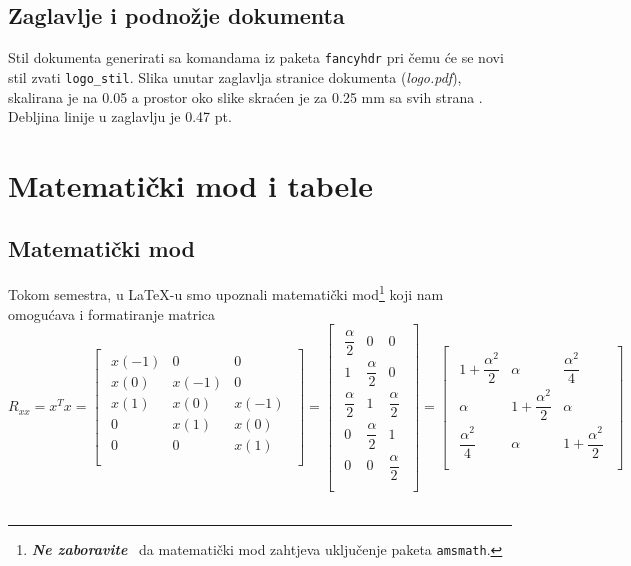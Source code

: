 \documentclass[letterpaper,10pt]{article}
\newcommand{\crveno}[1]
 {\textsl{\textbf{\color{boja1}#1\color{black}}}~}
\begin{document}
\subsection{Zaglavlje i podnožje dokumenta}
\textrm{Stil dokumenta generirati sa komandama iz paketa \texttt{fancyhdr} pri čemu će se novi stil zvati \texttt{logo\_stil}. Slika unutar zaglavlja stranice dokumenta (\textsl{logo.pdf}), skalirana je na 0.05 a prostor oko slike skraćen je za 0.25 mm sa svih strana}  . Debljina linije u zaglavlju je 0.47 pt.
\section{Matematički mod i tabele}
\subsection{Matematički mod}
Tokom semestra, u \LaTeX-u smo upoznali matematički mod\footnote{\crveno{Ne zaboravite} da matematički mod zahtjeva uključenje paketa \texttt{amsmath}.} koji nam omogućava i formatiranje matrica \\ \hfill{} 
\normalsize{\begin{equation*}
R_{xx}=x^T x = \begin{bmatrix}\begin{array}{ccc}
 x(-1) &  0 & 0 \\[2mm]
 x(0) & x(-1) & 0 \\[2mm]
 x(1) & x(0) & x(-1) \\[2mm]
 0 & x(1) & x(0)\\[2mm]
 0 & 0 & x(1)\\\end{array}
\end{bmatrix} = 
\begin{bmatrix}\begin{array}{ccc}
\dfrac{\alpha}{2} &  0 & 0 \\
 1 & \dfrac{\alpha}{2} & 0 \\
 \dfrac{\alpha}{2} & 1 & \dfrac{\alpha}{2} \\
 0 & \dfrac{\alpha}{2} & 1 \\
 0 & 0 & \dfrac{\alpha}{2} \\\end{array} 
\end{bmatrix} =
\begin{bmatrix}\begin{array}{ccc}
 1+\dfrac{\alpha^2}{2} &  \alpha & \dfrac{\alpha^2}{4} \\
 \alpha & 1+\dfrac{\alpha^2}{2} & \alpha \\
 \dfrac{\alpha^2}{4} & \alpha & 1+\dfrac{\alpha^2}{2} \\\end{array}
\end{bmatrix}
\end{equation*}} \\
\end{document}
